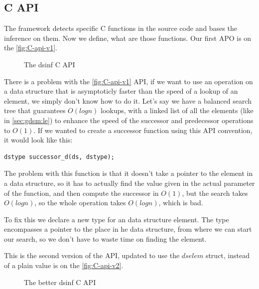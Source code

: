 \documentclass[a4paper,11pt]{article}
\begin{document}
	\subsection{C API}
        The framework detects specific C functions in the source code and bases the inference on them. Now we define,
        what are those functions. Our first APO is on the \autoref{fig:C-api-v1}.

        \begin{figure}[h!]
            

            \caption{The dsinf C API}

            \label{fig:C-api-v1}
        \end{figure}

        There is a problem with the \autoref{fig:C-api-v1} API, if we want to use an operation on a data structure that
        is asymptoticly faster than the speed of a lookup of an element, we simply don't know how to do it. Let's say we
        have a balanced search tree that guarantees $O(log n)$ lookups, with a linked list of all the elements (like in
        \autoref{sec:gdsm:le}) to enhance the speed of the successor and predecessor operations to $O(1)$. If we wanted to create a
        successor function using this API convention, it would look like this:

        \begin{lstlisting}
dstype successor_d(ds, dstype);
        \end{lstlisting}
        The problem with this function is that it doesn't take a pointer to the element in a data structure, so it has
        to actually find the value given in the actual parameter of the function, and then compute the successor in
        $O(1)$, but the search takes $O(log n)$, so the whole operation takes $O(log n)$, which is bad.

        To fix this we declare a new type for an data structure element. The type encompasses a pointer to the place in
        he data structure, from where we can start our search, so we don't have to waste time on finding the element.

        This is the second version of the API, updated to use the $dselem$ struct, instead of a plain value is on the
        \autoref{fig:C-api-v2}.

        \begin{figure}[h!]
            
            \caption{The better dsinf C API}

            \label{fig:C-api-v2}
        \end{figure}
\end{document}
